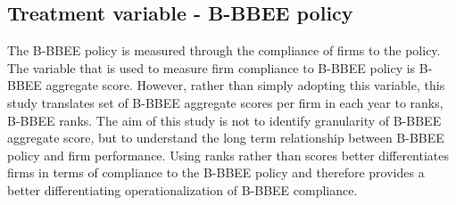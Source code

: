 \subsection{Treatment variable - B-BBEE policy}
The B-BBEE policy is measured through the compliance of firms to the policy. The variable that is used to measure firm compliance to B-BBEE policy is B-BBEE aggregate score. However, rather than simply adopting this variable, this study translates set of B-BBEE aggregate scores per firm in each year to ranks, B-BBEE ranks. The aim of this study is not to identify granularity of B-BBEE aggregate score, but to understand the long term relationship between B-BBEE policy and firm performance. Using ranks rather than scores better differentiates firms in terms of compliance to the B-BBEE policy and therefore provides a better differentiating operationalization of B-BBEE compliance.

